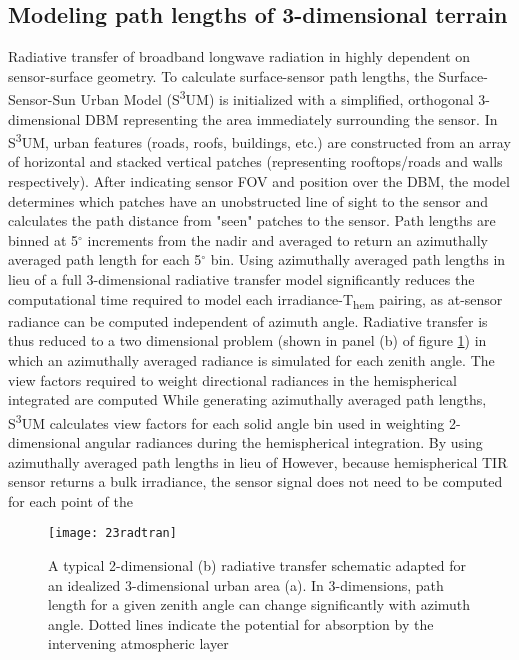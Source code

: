 \subsection{Modeling path lengths of 3-dimensional terrain}

Radiative transfer of broadband longwave radiation in highly dependent on sensor-surface geometry. To calculate surface-sensor path lengths, the Surface-Sensor-Sun Urban Model (S\textsuperscript{3}UM) \cite{Soux2004} is initialized with a simplified, orthogonal 3-dimensional DBM representing the area immediately surrounding the sensor. In S\textsuperscript{3}UM, urban features (roads, roofs, buildings, etc.) are constructed from an array of horizontal and stacked vertical patches (representing rooftops/roads and walls respectively). After indicating sensor FOV and position over the DBM, the model determines which patches have an unobstructed line of sight to the sensor and calculates the path distance from "seen" patches to the sensor. Path lengths are binned at 5$^{\circ}$ increments from the nadir and averaged to return an azimuthally averaged path length for each 5$^{\circ}$ bin. Using azimuthally averaged path lengths in lieu of a full 3-dimensional radiative transfer model significantly reduces the computational time required to model each irradiance-T\textsubscript{hem} pairing, as at-sensor radiance can be computed independent of azimuth angle. Radiative transfer is thus reduced to a two dimensional problem (shown in panel (b) of figure \ref{23radtran}) in which an azimuthally averaged radiance is simulated for each zenith angle. The view factors required to weight directional radiances in the hemispherical integrated are computed While generating azimuthally averaged path lengths, S\textsuperscript{3}UM calculates view factors for each solid angle bin used in weighting 2-dimensional angular radiances during the hemispherical integration.  By using azimuthally averaged path lengths in lieu of  However, because hemispherical TIR sensor returns a bulk irradiance, the sensor signal does not need to be computed for each point of the

\begin{figure}[!ht]
	\texttt{[image: 23radtran]}
	\label{23radtran}
	\caption{A typical 2-dimensional (b) radiative transfer schematic adapted for an idealized 3-dimensional urban area (a). In 3-dimensions, path length for a given zenith angle can change significantly with azimuth angle. Dotted lines indicate the potential for absorption by the intervening atmospheric layer}
\end{figure}


